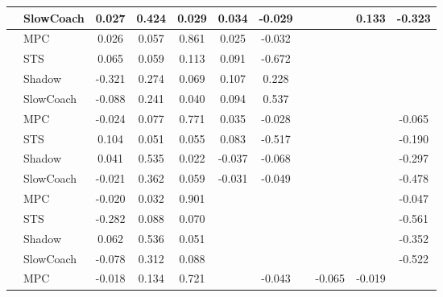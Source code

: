 \begin{tabular}{|l|l|*{9}{c|}}
                                                           & SlowCoach &    0.027 &     0.424 &     0.029 &  0.034 & -0.029 &     &      &   0.133 &   -0.323 \\
\midrule
[True, True, True, True, True, False, False, False, False] & MPC &    0.026 &     0.057 &     0.861 &  0.025 & -0.032 &     &      &      &       \\
                                                           & STS &    0.065 &     0.059 &     0.113 &  0.091 & -0.672 &     &      &      &       \\
                                                           & Shadow &   -0.321 &     0.274 &     0.069 &  0.107 &  0.228 &     &      &      &       \\
                                                           & SlowCoach &   -0.088 &     0.241 &     0.040 &  0.094 &  0.537 &     &      &      &       \\
\midrule
[True, True, True, True, True, False, False, False, True] & MPC &   -0.024 &     0.077 &     0.771 &  0.035 & -0.028 &     &      &      &   -0.065 \\
                                                           & STS &    0.104 &     0.051 &     0.055 &  0.083 & -0.517 &     &      &      &   -0.190 \\
                                                           & Shadow &    0.041 &     0.535 &     0.022 & -0.037 & -0.068 &     &      &      &   -0.297 \\
                                                           & SlowCoach &   -0.021 &     0.362 &     0.059 & -0.031 & -0.049 &     &      &      &   -0.478 \\
\midrule
[True, True, True, False, False, False, False, False, True] & MPC &   -0.020 &     0.032 &     0.901 &     &     &     &      &      &   -0.047 \\
                                                           & STS &   -0.282 &     0.088 &     0.070 &     &     &     &      &      &   -0.561 \\
                                                           & Shadow &    0.062 &     0.536 &     0.051 &     &     &     &      &      &   -0.352 \\
                                                           & SlowCoach &   -0.078 &     0.312 &     0.088 &     &     &     &      &      &   -0.522 \\
\midrule
[True, True, True, False, True, False, True, True, False] & MPC &   -0.018 &     0.134 &     0.721 &     & -0.043 &     &  -0.065 &  -0.019 &       \\

\end{tabular}
